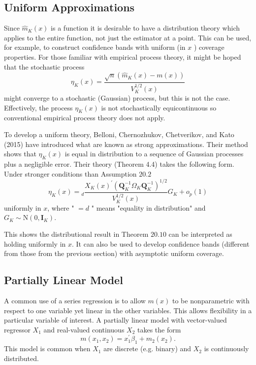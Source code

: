 \documentclass[10pt]{article}
\begin{document}
\subsection{Uniform Approximations}
Since $\widehat{m}_{K}(x)$ is a function it is desirable to have a distribution theory which applies to the entire function, not just the estimator at a point. This can be used, for example, to construct confidence bands with uniform (in $x$ ) coverage properties. For those familiar with empirical process theory, it might be hoped that the stochastic process
$$
\eta_{K}(x)=\frac{\sqrt{n}\left(\widehat{m}_{K}(x)-m(x)\right)}{V_{K}^{1 / 2}(x)}
$$
might converge to a stochastic (Gaussian) process, but this is not the case. Effectively, the process $\eta_{K}(x)$ is not stochastically equicontinuous so conventional empirical process theory does not apply.

To develop a uniform theory, Belloni, Chernozhukov, Chetverikov, and Kato (2015) have introduced what are known as strong approximations. Their method shows that $\eta_{K}(x)$ is equal in distribution to a sequence of Gaussian processes plus a negligible error. Their theory (Theorem 4.4) takes the following form. Under stronger conditions than Assumption $20.2$
$$
\eta_{K}(x)={ }_{d} \frac{X_{K}(x)^{\prime}\left(\boldsymbol{Q}_{K}^{-1} \Omega_{K} \boldsymbol{Q}_{K}^{-1}\right)^{1 / 2}}{V_{K}^{1 / 2}(x)} G_{K}+o_{p}(1)
$$
uniformly in $x$, where " $=d$ " means "equality in distribution" and $G_{K} \sim \mathrm{N}\left(0, \boldsymbol{I}_{K}\right)$.

This shows the distributional result in Theorem $20.10$ can be interpreted as holding uniformly in $x$. It can also be used to develop confidence bands (different from those from the previous section) with asymptotic uniform coverage.

\subsection{Partially Linear Model}
A common use of a series regression is to allow $m(x)$ to be nonparametric with respect to one variable yet linear in the other variables. This allows flexibility in a particular variable of interest. A partially linear model with vector-valued regressor $X_{1}$ and real-valued continuous $X_{2}$ takes the form
$$
m\left(x_{1}, x_{2}\right)=x_{1}^{\prime} \beta_{1}+m_{2}\left(x_{2}\right) .
$$
This model is common when $X_{1}$ are discrete (e.g. binary) and $X_{2}$ is continuously distributed.
\end{document}
